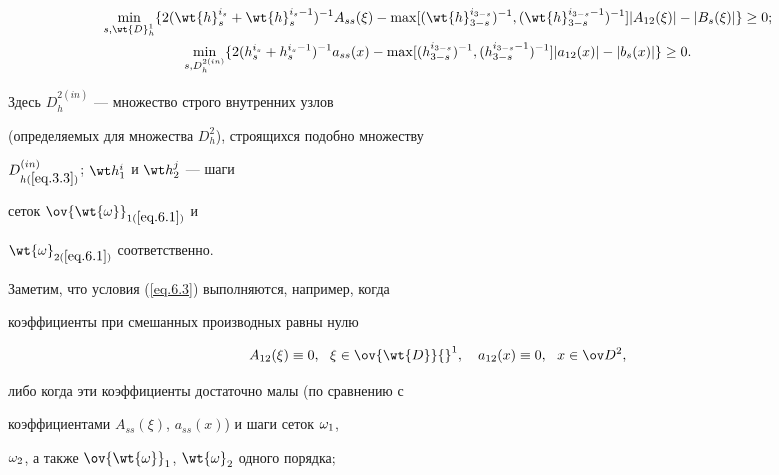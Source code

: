 \begin{subequations} \label{eq.6.3}


\begin{gather}\label{eq.6.3a}


\min_{s,\wt{D}_h^1} \{2(\wt{h}_s^{i_s}+


\wt{h}_s^{i_s-1})^{-1}A_{ss}(\xi)-


\max [(\wt{h}_{3-s}^{i_{3-s}})^{-1},


(\wt{h}_{3-s}^{i_{3-s}-1})^{-1}]


|A_{12}(\xi)|-|B_s(\xi)| \}\geq 0; \\


%


\label{eq.6.3b}


\min_{s,D_h^{2(in)}} \{2(h_s^{i_s}+h_s^{i_s-1})^{-1}a_{ss}(x)-


\max [(h_{3-s}^{i_{3-s}})^{-1},


(h_{3-s}^{i_{3-s}-1})^{-1} ]


|a_{12}(x)|-|b_s(x)| \}\geq 0.


\end{gather}


\end{subequations}


Здесь $D_h^{2(in)}$ --- множество строго внутренних узлов


(определяемых для множества $D_h^2$), строящихся подобно множеству


$D_{h(\ref{eq.3.3})}^{(in)}$; $\wt h{}_1^i$ и $\wt h{}_2^j$ --- шаги


сеток $\ov{\wt{\om}}_{1(\ref{eq.6.1})}$ и


$\wt{\om}_{2(\ref{eq.6.1})}$ соответственно.





Заметим, что условия (\ref{eq.6.3}) выполняются, например, когда


коэффициенты при смешанных производных равны нулю


$$


A_{12}(\xi)\equiv 0,\ \ \xi\in \ov{\wt{D}}{}^1,


\quad a_{12}(x)\equiv 0,\ \ x\in\od{}^2,


$$


либо когда эти коэффициенты достаточно малы (по сравнению с


коэффициентами $A_{ss}(\xi)$, $a_{ss}(x)$) и шаги сеток $\omega_1$,


$\omega_2$, а также $\ov{\wt{\om}}_1$, $\wt{\om}_2$ одного порядка;


